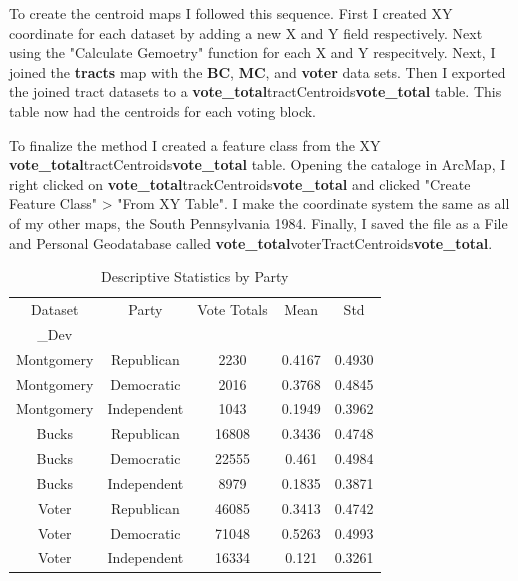 \documentclass[12pt]{article}
\begin{document}
To create the centroid maps I followed this sequence.  First I created XY coordinate for each dataset by adding a new X and Y field respectively.  Next using the "Calculate Gemoetry" function for each X and Y respecitvely.  Next, I joined the \textbf{tracts} map with the \textbf{BC}, \textbf{MC}, and \textbf{voter} data sets.  Then I exported the joined tract datasets to a \textbf{vote\_total}tractCentroids\textbf{vote\_total} table.  This table now had the centroids for each voting block.  

To finalize the method I created a feature class from the XY \textbf{vote\_total}tractCentroids\textbf{vote\_total} table.  Opening the cataloge in ArcMap, I right clicked on \textbf{vote\_total}trackCentroids\textbf{vote\_total} and clicked "Create Feature Class" > "From XY Table".  I make the coordinate system the same as all of my other maps, the South Pennsylvania 1984.  Finally, I saved the file as a File and Personal Geodatabase called \textbf{vote\_total}voterTractCentroids\textbf{vote\_total}.


\begin{table}[]
\centering
\caption{Descriptive Statistics by Party}
\label{my-label}
\begin{tabular}{ccccc}
Dataset    & Party       & Vote Totals & Mean   & Std\\\_Dev \\ \hline
Montgomery & Republican  & 2230         & 0.4167 & 0.4930    \\
Montgomery & Democratic  & 2016         & 0.3768 & 0.4845   \\
Montgomery & Independent & 1043         & 0.1949 & 0.3962   \\ \hline
Bucks      & Republican  & 16808        & 0.3436 & 0.4748   \\
Bucks      & Democratic  & 22555        & 0.461  & 0.4984   \\
Bucks      & Independent & 8979         & 0.1835 & 0.3871   \\ \hline
Voter      & Republican  & 46085        & 0.3413 & 0.4742   \\
Voter      & Democratic  & 71048        & 0.5263 & 0.4993   \\
Voter      & Independent & 16334        & 0.121  & 0.3261  \\ \hline \hline
\end{tabular}
\end{table}
\end{document}
